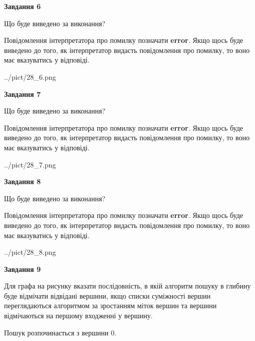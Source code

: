 \documentclass[12pt, ukrainian]{article}
\begin{document}
{\begin {large}
{\begin {center}\textbf{Завдання 6}\end {center}}\par
Що буде виведено за виконання?

Повідомлення інтерпретатора про помилку позначати \textbf{error}.
Якщо щось буде виведено до того, як інтерпретатор видасть повідомлення про помилку, 
то воно має вказуватись у відповіді. \par


\begin{center}
	{../pict/28_6.png}
\end{center}
\newpage

{\begin {center}\textbf{Завдання 7}\end {center}}\par
Що буде виведено за виконання?

Повідомлення інтерпретатора про помилку позначати \textbf{error}.
Якщо щось буде виведено до того, як інтерпретатор видасть повідомлення про помилку, 
то воно має вказуватись у відповіді. \par


\begin{center}
	{../pict/28_7.png}
\end{center}
\newpage

{\begin {center}\textbf{Завдання 8}\end {center}}\par
Що буде виведено за виконання?

Повідомлення інтерпретатора про помилку позначати \textbf{error}.
Якщо щось буде виведено до того, як інтерпретатор видасть повідомлення про помилку, 
то воно має вказуватись у відповіді. \par


\begin{center}
	{../pict/28_8.png}
\end{center}
\newpage

{\begin {center}\textbf{Завдання 9}\end {center}}\par
Для графа на рисунку вказати послідовність, в якій алгоритм пошуку в глибину буде відмічати відвідані вершини, якщо списки суміжності вершин переглядаються алгоритмом за зростанням міток вершин та вершини відмічаються на першому вход\-женні у вершину.\par
Пошук розпочинається з вершини 0.\par


\end{large}}
\end{document}
